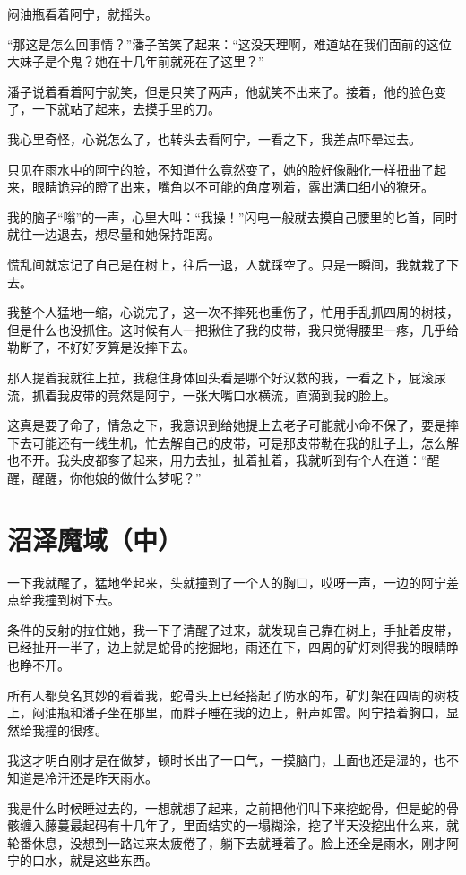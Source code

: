 闷油瓶看着阿宁，就摇头。

“那这是怎么回事情？”潘子苦笑了起来：“这没天理啊，难道站在我们面前的这位大妹子是个鬼？她在十几年前就死在了这里？”

潘子说着看着阿宁就笑，但是只笑了两声，他就笑不出来了。接着，他的脸色变了，一下就站了起来，去摸手里的刀。

我心里奇怪，心说怎么了，也转头去看阿宁，一看之下，我差点吓晕过去。

只见在雨水中的阿宁的脸，不知道什么竟然变了，她的脸好像融化一样扭曲了起来，眼睛诡异的瞪了出来，嘴角以不可能的角度咧着，露出满口细小的獠牙。

我的脑子“嗡”的一声，心里大叫：“我操！”闪电一般就去摸自己腰里的匕首，同时就往一边退去，想尽量和她保持距离。

慌乱间就忘记了自己是在树上，往后一退，人就踩空了。只是一瞬间，我就栽了下去。

我整个人猛地一缩，心说完了，这一次不摔死也重伤了，忙用手乱抓四周的树枝，但是什么也没抓住。这时候有人一把揪住了我的皮带，我只觉得腰里一疼，几乎给勒断了，不好好歹算是没摔下去。

那人提着我就往上拉，我稳住身体回头看是哪个好汉救的我，一看之下，屁滚尿流，抓着我皮带的竟然是阿宁，一张大嘴口水横流，直滴到我的脸上。

这真是要了命了，情急之下，我意识到给她提上去老子可能就小命不保了，要是摔下去可能还有一线生机，忙去解自己的皮带，可是那皮带勒在我的肚子上，怎么解也不开。我头皮都奓了起来，用力去扯，扯着扯着，我就听到有个人在道：“醒醒，醒醒，你他娘的做什么梦呢？”

\chapter{沼泽魔域（中）}

一下我就醒了，猛地坐起来，头就撞到了一个人的胸口，哎呀一声，一边的阿宁差点给我撞到树下去。

条件的反射的拉住她，我一下子清醒了过来，就发现自己靠在树上，手扯着皮带，已经扯开一半了，边上就是蛇骨的挖掘地，雨还在下，四周的矿灯刺得我的眼睛睁也睁不开。

所有人都莫名其妙的看着我，蛇骨头上已经搭起了防水的布，矿灯架在四周的树枝上，闷油瓶和潘子坐在那里，而胖子睡在我的边上，鼾声如雷。阿宁捂着胸口，显然给我撞的很疼。

我这才明白刚才是在做梦，顿时长出了一口气，一摸脑门，上面也还是湿的，也不知道是冷汗还是昨天雨水。

我是什么时候睡过去的，一想就想了起来，之前把他们叫下来挖蛇骨，但是蛇的骨骸缠入藤蔓最起码有十几年了，里面结实的一塌糊涂，挖了半天没挖出什么来，就轮番休息，没想到一路过来太疲倦了，躺下去就睡着了。脸上还全是雨水，刚才阿宁的口水，就是这些东西。

